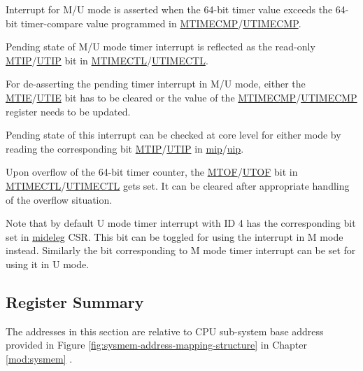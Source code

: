 \documentclass[main\_\_EN.tex]{subfiles}
\begin{document}
Interrupt for M/U mode is asserted when the 64-bit timer value exceeds the 64-bit timer-compare value programmed in \hyperref[regdesc:CLINTMTIMECMPREG]{MTIMECMP}/\hyperref[regdesc:CLINTUTIMECMPREG]{UTIMECMP}.

Pending state of M/U mode timer interrupt is reflected as the read-only \hyperref[fielddesc:CLINTMTIMECTLMTIP]{MTIP}/\hyperref[fielddesc:CLINTUTIMECTLUTIP]{UTIP} bit in \hyperref[regdesc:CLINTMTIMECTLREG]{MTIMECTL}/\hyperref[regdesc:CLINTUTIMECTLREG]{UTIMECTL}.

For de-asserting the pending timer interrupt in M/U mode, either the \hyperref[fielddesc:CLINTMTIMECTLMTIE]{MTIE}/\hyperref[fielddesc:CLINTUTIMECTLUTIE]{UTIE} bit has to be cleared or the value of the \hyperref[regdesc:CLINTMTIMECMPREG]{MTIMECMP}/\hyperref[regdesc:CLINTUTIMECMPREG]{UTIMECMP} register needs to be updated.

Pending state of this interrupt can be checked at core level for either mode by reading the corresponding bit \hyperref[fielddesc:MIPMTIP]{MTIP}/\hyperref[fielddesc:UIPUTIP]{UTIP} in \hyperref[regdesc:MIP]{mip}/\hyperref[regdesc:UIP]{uip}.

Upon overflow of the 64-bit timer counter, the \hyperref[fielddesc:CLINTMTIMECTLMTOF]{MTOF}/\hyperref[fielddesc:CLINTUTIMECTLUTOF]{UTOF} bit in \hyperref[regdesc:CLINTMTIMECTLREG]{MTIMECTL}/\hyperref[regdesc:CLINTUTIMECTLREG]{UTIMECTL} gets set. It can be cleared after appropriate handling of the overflow situation.

Note that by default U mode timer interrupt with ID 4 has the corresponding bit set in \hyperref[regdesc:MIDELEG]{mideleg} CSR. This bit can be toggled for using the interrupt in M mode instead. Similarly the bit corresponding to M mode timer interrupt can be set for using it in U mode.


\hypertarget{riscvcpu-clint-reg-summ}{}
\subsection{Register Summary}
\label{sec:riscvcpu-clint-reg-summ}


The addresses in this section are relative to CPU sub-system base address provided in Figure \ref{fig:sysmem-address-mapping-structure} in Chapter \ref{mod:sysmem} \textit{}.


\end{document}
